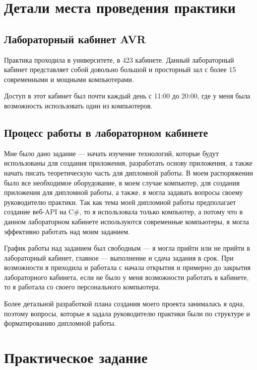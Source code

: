 \documentclass[a4paper,12pt]{report}
\begin{document}
\chapter{Детали места проведения практики}

\section{Лабораторный кабинет AVR}

Практика проходила в университете, в 423 кабинете.
Данный лабораторный кабинет представляет собой довольно большой и просторный зал с более 15 современными и мощными компьютерами.

Доступ в этот кабинет был почти каждый день с 11:00 до 20:00, где у меня была возможность использовать один из компьютеров.

\section{Процесс работы в лабораторном кабинете}

Мне было дано задание --- начать изучение технологий, которые будут использованы для создания приложения, разработать основу приложения, 
а также начать писать теоретическую часть для дипломной работы.
В моем распоряжении было все необходимое оборудование, в моем случае компьютер, для создания приложения для дипломной работы, 
а также, я могла задавать вопросы своему руководителю практики. Так как тема моей дипломной работы предполагает создание веб-\acs{API} на C\#, 
то я использовала только компьютер, а потому что в данном лабораторном кабинете используются современные компьютеры, 
я могла эффективно работать над моим заданием. 

График работы над заданием был свободным --- я могла прийти или не прийти в лабораторный кабинет, главное --- выполнение и сдача задания в срок.
При возможности я приходила и работала с начала открытия и примерно до закрытия лабораторного кабинета, если не было у меня возможности работать в кабинете, 
то я работала со своего персонального компьютера.

Более детальной разработкой плана создания моего проекта занималась я одна, поэтому вопросы, которые я задала руководителю практики были по 
структуре и форматированию дипломной работы.

\chapter{Практическое задание}
\end{document}
